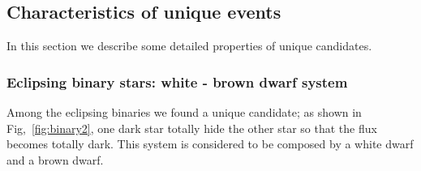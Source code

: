 \documentclass[iop, apj]{emulateapj}
\newcommand{\?}{\stackrel{?}{=}}
\begin{document}
\begin{itemize}
	
\end{itemize}



\subsection{Characteristics of unique events}
\label{sec:unieques}
In this section we describe some detailed properties of unique candidates. 
%
\subsubsection{Eclipsing binary stars: white - brown dwarf system}
Among the eclipsing binaries we found a unique candidate;  
as shown in Fig,~\ref{fig:binary2}, one dark star totally hide the other star so that the flux becomes totally dark. This system is considered to be composed by a white dwarf and a brown dwarf. 
%
\end{document}
